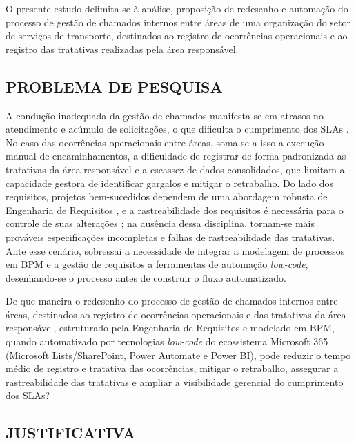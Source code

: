 O presente estudo delimita-se à análise, proposição de redesenho e automação do processo de gestão
  de chamados internos entre áreas de uma organização do setor de serviços de transporte, destinados
  ao registro de ocorrências operacionais e ao registro das tratativas realizadas pela área
  responsável.
 
\subsection{PROBLEMA DE PESQUISA}
 
A condução inadequada da gestão de chamados manifesta-se em atrasos no atendimento e acúmulo de
  solicitações, o que dificulta o cumprimento dos SLAs \cite{nainggolan2025}.
No caso das ocorrências operacionais entre áreas, soma-se a isso a execução manual de
  encaminhamentos, a dificuldade de registrar de forma padronizada as tratativas da área responsável
  e a escassez de dados consolidados, que limitam a capacidade gestora de identificar gargalos e
  mitigar o retrabalho.
Do lado dos requisitos, projetos bem-sucedidos dependem de uma abordagem robusta de Engenharia de
  Requisitos \cite{costa2023}, e a rastreabilidade dos requisitos é necessária para o controle de
  suas alterações \cite{motta2017};
na ausência dessa disciplina, tornam-se mais prováveis especificações incompletas e falhas de
  rastreabilidade das tratativas.
Ante esse cenário, sobressai a necessidade de integrar a modelagem de processos em BPM e a gestão de
  requisitos a ferramentas de automação \textit{low-code}, desenhando-se o processo antes de
  construir o fluxo automatizado.
 
De que maneira o redesenho do processo de gestão de chamados internos entre áreas, destinados ao
  registro de ocorrências operacionais e das tratativas da área responsável, estruturado pela
  Engenharia de Requisitos e modelado em BPM, quando automatizado por tecnologias \textit{low-code}
  do ecossistema Microsoft 365 (Microsoft Lists/SharePoint, Power Automate e Power BI), pode reduzir
  o tempo médio de registro e tratativa das ocorrências, mitigar o retrabalho, assegurar a
  rastreabilidade das tratativas e ampliar a visibilidade gerencial do cumprimento dos SLAs?
 
\subsection{JUSTIFICATIVA}
 
